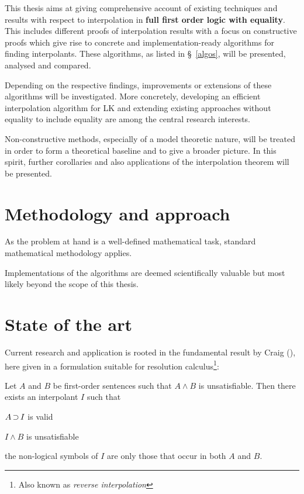\documentclass[,%
			paper=a4,%
			DIV10,
			liststotoc,
			bibtotoc,
			draft=false,%
			numbers=noendperiod
			]{scrartcl}
\begin{document}
This thesis aims at giving comprehensive account of existing techniques and results with respect to interpolation in \textbf{full first order logic with equality}.
This includes different proofs of interpolation results with a focus on constructive proofs which give rise to concrete and implementation-ready algorithms for finding interpolants.
These algorithms, as listed in \S~\ref{algos}, will be presented, analysed and compared. 

Depending on the respective findings, improvements or extensions of these algorithms will be investigated.
More concretely, developing an efficient interpolation algorithm for LK and extending existing approaches without equality to include equality are among the central research interests.

Non-constructive methods, especially of a model theoretic nature, will be treated in order to form a theoretical baseline and to give a broader picture.
In this spirit, further corollaries and also applications of the interpolation theorem will be presented.



\section{Methodology and approach}

As the problem at hand is a well-defined mathematical task, standard mathematical methodology applies.

Implementations of the algorithms are deemed scientifically valuable but most likely beyond the scope of this thesis.


\section{State of the art}

Current research and application is rooted in the fundamental result by Craig (\cite{craig57linear}), here given in a formulation suitable for resolution calculus\footnote{Also known as \emph{reverse interpolation}}:

\begin{samepage}
\begin{thm}[Interpolation]
	Let $A$ and $B$ be first-order sentences such that $ A \land B $ is unsatisfiable. 
	Then there exists an interpolant $I$ such that \nopagebreak[4]
	\begin{compactenum}
		\item $ A \operatorname{\supset} I$ is valid 
		\item $I \land B$ is unsatisfiable
		\item the non-logical symbols of $I$ are only those that occur in both $A$ and $B$. \qedhere
	\end{compactenum}
\end{thm}
\end{samepage}
\end{document}
